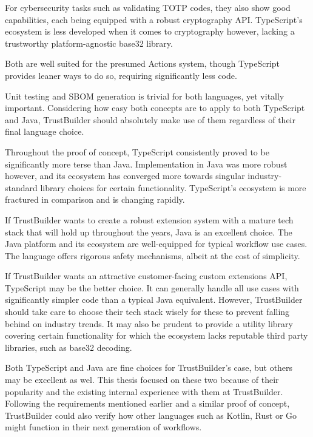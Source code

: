 For cybersecurity tasks such as validating TOTP codes, they also show good capabilities, each being equipped with a robust cryptography API. TypeScript's ecosystem is less developed when it comes to cryptography however, lacking a trustworthy platform-agnostic base32 library.

Both are well suited for the presumed Actions system, though TypeScript provides leaner ways to do so, requiring significantly less code.

Unit testing and SBOM generation is trivial for both languages, yet vitally important. Considering how easy both concepts are to apply to both TypeScript and Java, TrustBuilder should absolutely make use of them regardless of their final language choice.

Throughout the proof of concept, TypeScript consistently proved to be significantly more terse than Java. Implementation in Java was more robust however, and its ecosystem has converged more towards singular industry-standard library choices for certain functionality. TypeScript's ecosystem is more fractured in comparison and is changing rapidly.

\vspace{11pt}

If TrustBuilder wants to create a robust extension system with a mature tech stack that will hold up throughout the years, Java is an excellent choice. The Java platform and its ecosystem are well-equipped for typical workflow use cases. The language offers rigorous safety mechanisms, albeit at the cost of simplicity.

If TrustBuilder wants an attractive customer-facing custom extensions API, TypeScript may be the better choice. It can generally handle all use cases with significantly simpler code than a typical Java equivalent. However, TrustBuilder should take care to choose their tech stack wisely for these to prevent falling behind on industry trends. It may also be prudent to provide a utility library covering certain functionality for which the ecosystem lacks reputable third party libraries, such as base32 decoding.

Both TypeScript and Java are fine choices for TrustBuilder’s case, but others may be excellent as wel. This thesis focused on these two because of their popularity and the existing internal experience with them at TrustBuilder. Following the requirements mentioned earlier and a similar proof of concept, TrustBuilder could also verify how other languages such as Kotlin, Rust or Go might function in their next generation of workflows.
